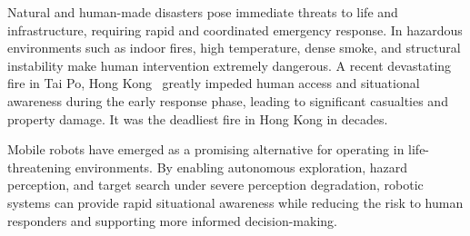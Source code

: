Natural and human-made disasters pose immediate threats to life and infrastructure, requiring rapid and coordinated emergency response. In hazardous environments such as indoor fires, high temperature, dense smoke, and structural instability make human intervention extremely dangerous. 
A recent devastating fire in Tai Po, Hong Kong~\cite{Grundy2025TaiPoFire} greatly impeded human access and situational awareness during the early response phase, leading to significant casualties and property damage. It was the deadliest fire in Hong Kong in decades.

Mobile robots have emerged as a promising alternative for operating in life-threatening environments. By enabling autonomous exploration, hazard perception, and target search under severe perception degradation, robotic systems can provide rapid situational awareness while reducing the risk to human responders and supporting more informed decision-making.

